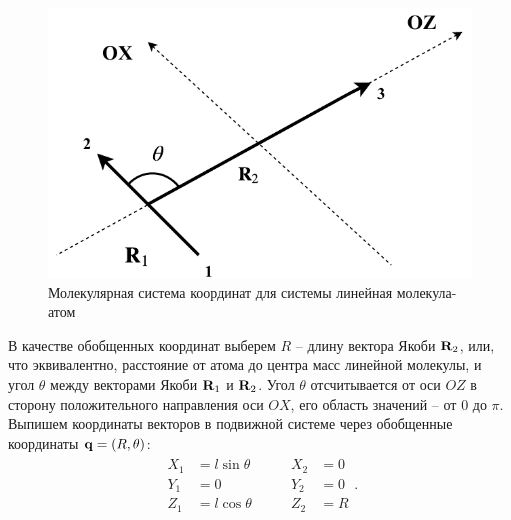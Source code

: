 \begin{figure}[H]
    \centering
    \includegraphics[width=0.5\linewidth]{pictures/triatom_coordinates.pdf}
    \caption{Молекулярная система координат для системы линейная молекула-атом}
    \label{fig:body-fixed-linear-atom}
\end{figure}

В качестве обобщенных координат выберем $R$ -- длину вектора Якоби $\mathbf{R}_2$, или, что эквивалентно, расстояние от атома до центра масс линейной молекулы, и угол $\theta$ между векторами Якоби $\mathbf{R}_1$ и $\mathbf{R}_2$. Угол $\theta$ отсчитывается от оси $OZ$ в сторону положительного направления оси $OX$, его область значений -- от $0$ до $\pi$. Выпишем координаты векторов в подвижной системе через обобщенные координаты $\mathbf{q} = \left( R, \theta \right)$: 
\begin{gather}
    \begin{aligned}
        X_1 &= l \sin \theta \\
        Y_1 &= 0 \\
        Z_1 &= l \cos \theta
    \end{aligned} \qquad
    \begin{aligned}
        X_2 &= 0 \\ 
        Y_2 &= 0 \\
        Z_2 &= R 
    \end{aligned}. \label{linear-molecule-atom-jacobi-coords}
\end{gather}

